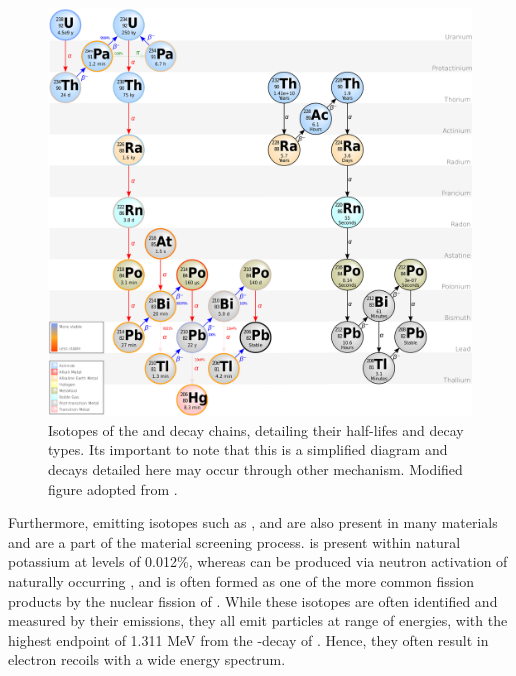 \begin{figure}[t!]
    \begin{center}
        \includegraphics[scale=0.75]{Chapter_3/Figures/U_Th_Chain.png}
        \caption[Isotopes if the \UTTE{} and \ThTTT{} decay chains, detailing their half-lifes and decay types.]%
        {Isotopes of the \UTTE{} and \ThTTT{} decay chains, detailing their half-lifes and decay types. Its important to note that this is a simplified diagram and decays detailed here may occur through other mechanism. Modified figure adopted from \cite{wikipedia_2020}.}
        \label{fig:u_238_and_th_232}
    \end{center}
\end{figure}
%


Furthermore, \gray{} emitting isotopes such as \KFZ{}, \CoSZ{} and \CsOTS{} are also present in many materials and are a part of the material screening process. \KFZ{} is present within natural potassium at levels of 0.012\%, whereas \CoSZ{} can be produced via neutron activation of naturally occurring \CoFN{}, and \CsOTS{} is often formed as one of the more common fission products by the nuclear fission of \UTTF{}. While these isotopes are often identified and measured by their \gray{} emissions, they all emit \beta particles at range of energies, with the highest endpoint of 1.311 MeV from the \beta-decay of \KFZ{}. Hence, they often result in electron recoils with a wide energy spectrum.

